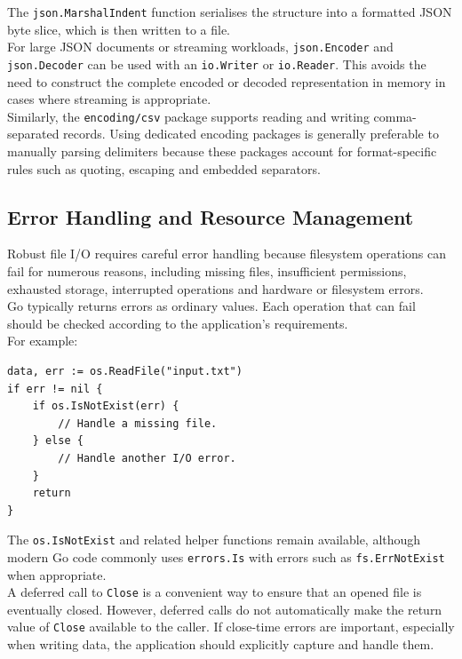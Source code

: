 The \texttt{json.MarshalIndent} function serialises the structure into a formatted JSON byte slice, which is then written to a file.\\

For large JSON documents or streaming workloads, \texttt{json.Encoder} and \texttt{json.Decoder} can be used with an \texttt{io.Writer} or \texttt{io.Reader}. This avoids the need to construct the complete encoded or decoded representation in memory in cases where streaming is appropriate.\\

Similarly, the \texttt{encoding/csv} package supports reading and writing comma-separated records. Using dedicated encoding packages is generally preferable to manually parsing delimiters because these packages account for format-specific rules such as quoting, escaping and embedded separators.\\

\subsection{Error Handling and Resource Management}

Robust file I/O requires careful error handling because filesystem operations can fail for numerous reasons, including missing files, insufficient permissions, exhausted storage, interrupted operations and hardware or filesystem errors.\\

Go typically returns errors as ordinary values. Each operation that can fail should be checked according to the application's requirements.\\

For example:

\begin{lstlisting}
data, err := os.ReadFile("input.txt")
if err != nil {
    if os.IsNotExist(err) {
        // Handle a missing file.
    } else {
        // Handle another I/O error.
    }
    return
}
\end{lstlisting}

The \texttt{os.IsNotExist} and related helper functions remain available, although modern Go code commonly uses \texttt{errors.Is} with errors such as \texttt{fs.ErrNotExist} when appropriate.\\

A deferred call to \texttt{Close} is a convenient way to ensure that an opened file is eventually closed. However, deferred calls do not automatically make the return value of \texttt{Close} available to the caller. If close-time errors are important, especially when writing data, the application should explicitly capture and handle them.\\

